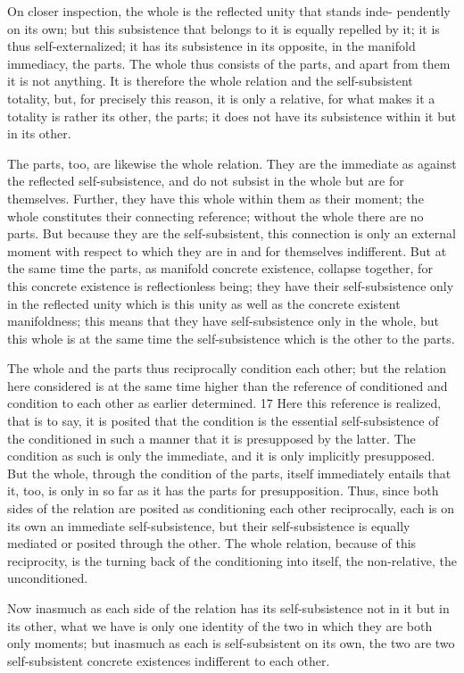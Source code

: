 On closer inspection, the whole is the reflected unity that stands inde-
pendently on its own; but this subsistence that belongs to it is equally
repelled by it; it is thus self-externalized; it has its subsistence in its opposite,
in the manifold immediacy, the parts. The whole thus consists of the parts,
and apart from them it is not anything. It is therefore the whole relation
and the self-subsistent totality, but, for precisely this reason, it is only a
relative, for what makes it a totality is rather its other, the parts; it does not
have its subsistence within it but in its other.

The parts, too, are likewise the whole relation. They are the immediate as
against the reflected self-subsistence, and do not subsist in the whole but are
for themselves. Further, they have this whole within them as their moment;
the whole constitutes their connecting reference; without the whole there
are no parts. But because they are the self-subsistent, this connection is only
an external moment with respect to which they are in and for themselves
indifferent. But at the same time the parts, as manifold concrete existence,
collapse together, for this concrete existence is reflectionless being; they
have their self-subsistence only in the reflected unity which is this unity
as well as the concrete existent manifoldness; this means that they have
self-subsistence only in the whole, but this whole is at the same time the
self-subsistence which is the other to the parts.

The whole and the parts thus reciprocally condition each other; but the
relation here considered is at the same time higher than the reference of
conditioned and condition to each other as earlier determined. 17 Here this
reference is realized, that is to say, it is posited that the condition is the
essential self-subsistence of the conditioned in such a manner that it is
presupposed by the latter. The condition as such is only the immediate,
and it is only implicitly presupposed. But the whole, through the condition
of the parts, itself immediately entails that it, too, is only in so far as it
has the parts for presupposition. Thus, since both sides of the relation
are posited as conditioning each other reciprocally, each is on its own an
immediate self-subsistence, but their self-subsistence is equally mediated or
posited through the other. The whole relation, because of this reciprocity,
is the turning back of the conditioning into itself, the non-relative, the
unconditioned.

Now inasmuch as each side of the relation has its self-subsistence not in
it but in its other, what we have is only one identity of the two in which
they are both only moments; but inasmuch as each is self-subsistent on its
own, the two are two self-subsistent concrete existences indifferent to each
other.

